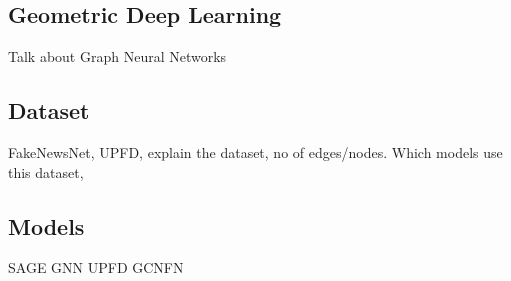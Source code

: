 \subsection{Geometric Deep Learning}
Talk about Graph Neural Networks

\subsection{Dataset}
FakeNewsNet, UPFD, explain the dataset, no of edges/nodes. Which models use this dataset,

\subsection{Models}
SAGE GNN
UPFD GCNFN
